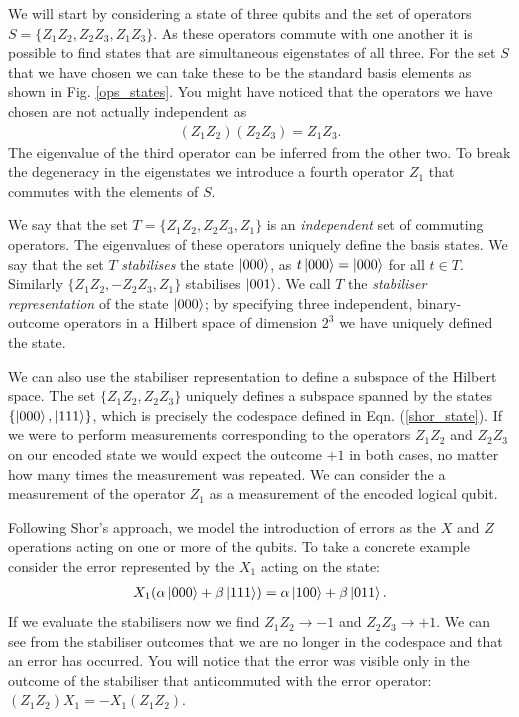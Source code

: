We will start by considering a state of three qubits and the set of operators $S = \{Z_1Z_2, Z_2Z_3, Z_1Z_3\}$. As these operators commute with one another it is possible to find states that are simultaneous eigenstates of all three. For the set $S$ that we have chosen we can take these to be the standard basis elements as shown in Fig. \ref{ops_states}. You might have noticed that the operators we have chosen are not actually independent as
\begin{align}
  (Z_1Z_2)(Z_2Z_3) = Z_1Z_3.
\end{align}
The eigenvalue of the third operator can be inferred from the other two. To break the degeneracy in the eigenstates we introduce a fourth operator $Z_1$ that commutes with the elements of $S$.

We say that the set $T = \{Z_1Z_2, Z_2Z_3, Z_1\}$ is an \textit{independent} set of commuting operators. The eigenvalues of these operators uniquely define the basis states. We say that the set $T$ \textit{stabilises} the state $\left\vert000\right\rangle$, as $t\left\vert000\right\rangle = \left\vert000\right\rangle$ for all $t\in T$. Similarly $\{Z_1Z_2, -Z_2Z_3, Z_1\}$ stabilises $\left\vert001\right\rangle$. We call $T$ the \textit{stabiliser representation} of the state $\left\vert000\right\rangle$; by specifying three independent, binary-outcome operators in a Hilbert space of dimension $2^3$ we have uniquely defined the state.

We can also use the stabiliser representation to define a subspace of the Hilbert space. The set $\{Z_1Z_2, Z_2Z_3\}$ uniquely defines a subspace spanned by the states $\{\left\vert000\right\rangle, \left\vert111\right\rangle\}$, which is precisely the codespace defined in Eqn. (\ref{shor_state}). If we were to perform measurements corresponding to the operators $Z_1Z_2$ and $Z_2Z_3$ on our encoded state we would expect the outcome $+1$ in both cases, no matter how many times the measurement was repeated. We can consider the a measurement of the operator $Z_1$ as a measurement of the encoded logical qubit.

Following Shor's approach, we model the introduction of errors as the $X$ and $Z$ operations acting on one or more of the qubits. To take a concrete example consider the error represented by the $X_1$ acting on the state:
\begin{align}
  X_1 (\alpha\left\vert000\right\rangle + \beta\left\vert111\right\rangle) = \alpha\left\vert100\right\rangle + \beta\left\vert011\right\rangle.
\end{align}
If we evaluate the stabilisers now we find $Z_1Z_2 \rightarrow -1$ and $Z_2 Z_3 \rightarrow +1$. We can see from the stabiliser outcomes that we are no longer in the codespace and that an error has occurred. You will notice that the error was visible only in the outcome of the stabiliser that anticommuted with the error operator: $(Z_1Z_2)X_1 = -X_1(Z_1Z_2)$.


